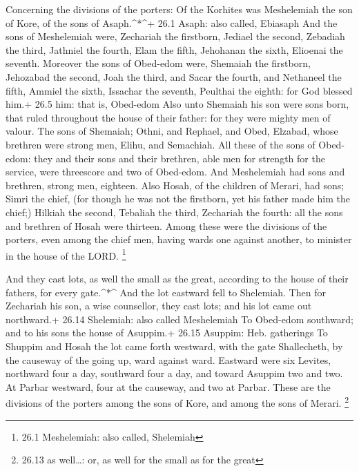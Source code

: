  Concerning the divisions of the porters: Of the Korhites
was Meshelemiah the son of Kore, of the sons of Asaph.\^{}*\^{}+ 26.1
Asaph: also called, Ebiasaph  And the sons of Meshelemiah
were, Zechariah the firstborn, Jediael the second, Zebadiah the third,
Jathniel the fourth,  Elam the fifth, Jehohanan the sixth,
Elioenai the seventh.  Moreover the sons of Obed-edom were,
Shemaiah the firstborn, Jehozabad the second, Joah the third, and Sacar
the fourth, and Nethaneel the fifth,  Ammiel the sixth,
Issachar the seventh, Peulthai the eighth: for God blessed him.+ 26.5
him: that is, Obed-edom  Also unto Shemaiah his son were
sons born, that ruled throughout the house of their father: for they
were mighty men of valour.  The sons of Shemaiah; Othni, and
Rephael, and Obed, Elzabad, whose brethren were strong men, Elihu, and
Semachiah.  All these of the sons of Obed-edom: they and
their sons and their brethren, able men for strength for the service,
were threescore and two of Obed-edom.  And Meshelemiah had
sons and brethren, strong men, eighteen.  Also Hosah, of
the children of Merari, had sons; Simri the chief, (for though he was
not the firstborn, yet his father made him the chief;) 
Hilkiah the second, Tebaliah the third, Zechariah the fourth: all the
sons and brethren of Hosah were thirteen.  Among these were
the divisions of the porters, even among the chief men, having wards one
against another, to minister in the house of the LORD. \footnote{26.1
  Meshelemiah: also called, Shelemiah}

 And they cast lots, as well the small as the great,
according to the house of their fathers, for every gate.\^{}*\^{}
 And the lot eastward fell to Shelemiah. Then for Zechariah
his son, a wise counsellor, they cast lots; and his lot came out
northward.+ 26.14 Shelemiah: also called Meshelemiah  To
Obed-edom southward; and to his sons the house of Asuppim.+ 26.15
Asuppim: Heb. gatherings  To Shuppim and Hosah the lot came
forth westward, with the gate Shallecheth, by the causeway of the going
up, ward against ward.  Eastward were six Levites,
northward four a day, southward four a day, and toward Asuppim two and
two.  At Parbar westward, four at the causeway, and two at
Parbar.  These are the divisions of the porters among the
sons of Kore, and among the sons of Merari. \footnote{26.13 as
  well\ldots: or, as well for the small as for the great}

